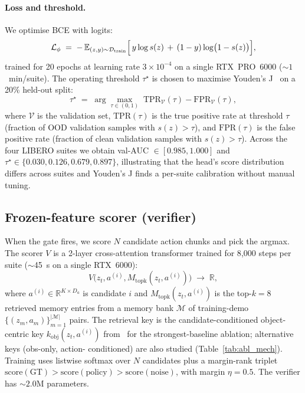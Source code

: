 \documentclass{article}
\begin{document}
\paragraph{Loss and threshold.} We optimise BCE with logits:
\begin{equation}
  \mathcal{L}_\phi
  \;=\;
  - \,\mathbb{E}_{(z, y)\sim\mathcal{D}_{\mathrm{train}}}
  \Bigl[\,
    y\log s(z) \,+\, (1-y)\log\bigl(1-s(z)\bigr)
  \Bigr],
  \label{eq:bce}
\end{equation}
trained for 20 epochs at learning rate $3\!\times\!10^{-4}$ on a single
RTX~PRO~6000 ($\sim\!1$~min/suite). The operating threshold $\tau^\star$
is chosen to maximise Youden's J~\citep{youden1950} on a 20\% held-out
split:
\begin{equation}
  \tau^\star
  \;=\;
  \arg\max_{\tau \in (0,1)}
  \;
  \mathrm{TPR}_{\mathcal{V}}(\tau) - \mathrm{FPR}_{\mathcal{V}}(\tau),
  \label{eq:youden}
\end{equation}
where $\mathcal{V}$ is the validation set, $\mathrm{TPR}(\tau)$ is the true positive
rate at threshold $\tau$ (fraction of OOD validation samples with
$s(z) > \tau$), and $\mathrm{FPR}(\tau)$ is the false positive rate
(fraction of clean validation samples with $s(z) > \tau$). Across
the four LIBERO suites we obtain val-AUC $\in [0.985, 1.000]$ and
$\tau^\star \in \{0.030, 0.126, 0.679, 0.897\}$, illustrating that
the head's score distribution differs across suites and Youden's J
finds a per-suite calibration without manual tuning.

\subsection{Frozen-feature scorer (verifier)}
\label{sec:method:verifier}

When the gate fires, we score $N$ candidate action chunks and pick
the argmax. The scorer $V$ is a 2-layer cross-attention transformer
trained for 8{,}000 steps per suite ($\sim$45~s on a single RTX~6000):
\begin{equation}
  V\bigl(z_t, a^{(i)}, M_{\mathrm{topk}}(z_t, a^{(i)})\bigr)
  \;\to\; \mathbb{R},
  \label{eq:verifier}
\end{equation}
where $a^{(i)}\in\mathbb{R}^{K\times D_a}$ is candidate $i$ and
$M_{\mathrm{topk}}(z_t, a^{(i)})$ is the top-$k{=}8$ retrieved memory
entries from a memory bank $\mathcal{M}$ of training-demo
$\{(z_m, a_m)\}_{m=1}^{|\mathcal{M}|}$ pairs. The retrieval key is the
candidate-conditioned object-centric key
$k_{\mathrm{obj}}(z_t, a^{(i)})$ from~\citep[App.\,B]{cover_vla2025} for
the strongest-baseline ablation; alternative keys (obs-only, action-
conditioned) are also studied (Table~\ref{tab:abl_mech}). Training uses
listwise softmax over $N$ candidates plus a margin-rank triplet
$\mathrm{score}(\mathrm{GT}) > \mathrm{score}(\mathrm{policy}) > \mathrm{score}(\mathrm{noise})$, with
margin $\eta = 0.5$. The verifier has $\sim 2.0$M parameters.
\end{document}
